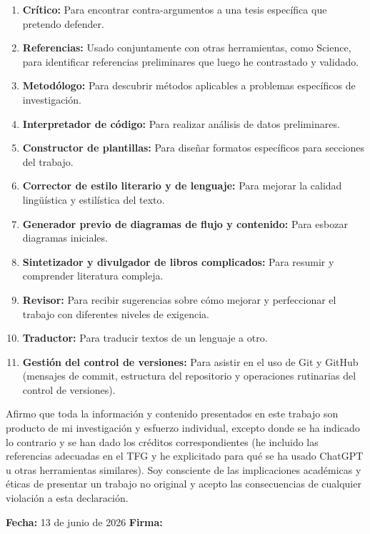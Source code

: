 \documentclass[12pt, a4paper]{book}
\begin{document}
\begin{enumerate}[leftmargin=2em, itemsep=1pt, topsep=2pt, parsep=0pt]
    \item \textbf{Crítico:} Para encontrar contra-argumentos a una tesis específica que pretendo defender.
    \item \textbf{Referencias:} Usado conjuntamente con otras herramientas, como Science, para identificar referencias preliminares que luego he contrastado y validado.
    \item \textbf{Metodólogo:} Para descubrir métodos aplicables a problemas específicos de investigación.
    \item \textbf{Interpretador de código:} Para realizar análisis de datos preliminares.
    \item \textbf{Constructor de plantillas:} Para diseñar formatos específicos para secciones del trabajo.
    \item \textbf{Corrector de estilo literario y de lenguaje:} Para mejorar la calidad lingüística y estilística del texto.
    \item \textbf{Generador previo de diagramas de flujo y contenido:} Para esbozar diagramas iniciales.
    \item \textbf{Sintetizador y divulgador de libros complicados:} Para resumir y comprender literatura compleja.
    \item \textbf{Revisor:} Para recibir sugerencias sobre cómo mejorar y perfeccionar el trabajo con diferentes niveles de exigencia.
    \item \textbf{Traductor:} Para traducir textos de un lenguaje a otro.
    \item \textbf{Gestión del control de versiones:} Para asistir en el uso de Git y GitHub (mensajes de commit, estructura del repositorio y operaciones rutinarias del control de versiones).
\end{enumerate}

\noindent
Afirmo que toda la información y contenido presentados en este trabajo son producto de mi investigación y esfuerzo individual, excepto donde se ha indicado lo contrario y se han dado los créditos correspondientes (he incluido las referencias adecuadas en el TFG y he explicitado para qué se ha usado ChatGPT u otras herramientas similares). Soy consciente de las implicaciones académicas y éticas de presentar un trabajo no original y acepto las consecuencias de cualquier violación a esta declaración.
\vspace{0.6em}

\noindent \textbf{Fecha:} 13 de junio de 2026 \hfill \textbf{Firma:}{\hspace{6cm}}
\endgroup
\end{document}
